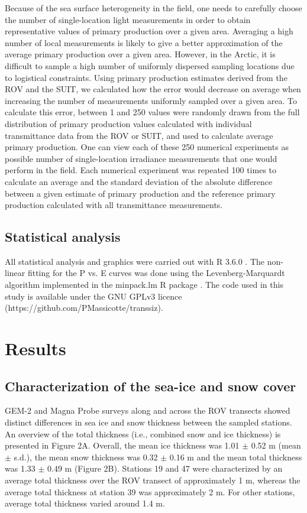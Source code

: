 \documentclass[draft]{agujournal2018}
\begin{document}
Because of the sea surface heterogeneity in the field, one needs to carefully choose the number of single-location light measurements in order to obtain representative values of primary production over a given area. Averaging a high number of local measurements is likely to give a better approximation of the average primary production over a given area. However, in the Arctic, it is difficult to sample a high number of uniformly dispersed sampling locations due to logistical constraints. Using primary production estimates derived from the ROV and the SUIT, we calculated how the error would decrease on average when increasing the number of measurements uniformly sampled over a given area. To calculate this error, between 1 and 250 values were randomly drawn from the full distribution of primary production values calculated with individual transmittance data from the ROV or SUIT, and used to calculate average primary production. One can view each of these 250 numerical experiments as possible number of single-location irradiance  measurements that one would perform in the field. Each numerical experiment was repeated 100 times to calculate an average and the standard deviation of the absolute difference between a given estimate of primary production and the reference primary production calculated with all transmittance measurements.

\subsection{Statistical analysis}

All statistical analysis and graphics were carried out with R 3.6.0 \citep{RCoreTeam2019}. The non-linear fitting for the P vs. E curves was done using the Levenberg-Marquardt algorithm implemented in the minpack.lm R package \citep{Elzhov2013}. The code used in this study is available under the GNU GPLv3 licence (https://github.com/PMassicotte/transsiz).

\section{Results}

\subsection{Characterization of the sea-ice and snow cover}

GEM-2 and Magna Probe surveys along and across the ROV transects showed distinct differences in sea ice and snow thickness between the sampled stations. An overview of the total thickness (i.e., combined snow and ice thickness) is presented in Figure 2A. Overall, the mean ice thickness was 1.01 $\pm$ 0.52 m (mean $\pm$ s.d.), the mean snow thickness was 0.32 $\pm$ 0.16 m and the mean total thickness was 1.33 $\pm$ 0.49 m (Figure 2B). Stations 19 and 47 were characterized by an average total thickness over the ROV transect of approximately 1 m, whereas the average total thickness at station 39 was approximately 2 m. For other stations, average total thickness varied around 1.4 m.
\end{document}
